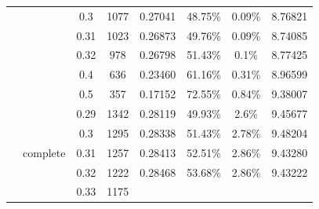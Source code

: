\begin{table}[H]
{\begin{tabular}{|cccccccc|}
\multicolumn{1}{|c|}{} &
  \multicolumn{1}{c|}{} &
  \multicolumn{1}{c|}{0.3} &
  \multicolumn{1}{c|}{1077} &
  \multicolumn{1}{c|}{0.27041} &
  \multicolumn{1}{c|}{48.75\%} &
  \multicolumn{1}{c|}{0.09\%} &
  8.76821 \\ \cline{3-8} 
\multicolumn{1}{|c|}{} &
  \multicolumn{1}{c|}{} &
  \multicolumn{1}{c|}{0.31} &
  \multicolumn{1}{c|}{1023} &
  \multicolumn{1}{c|}{0.26873} &
  \multicolumn{1}{c|}{49.76\%} &
  \multicolumn{1}{c|}{0.09\%} &
  8.74085 \\ \cline{3-8} 
\multicolumn{1}{|c|}{} &
  \multicolumn{1}{c|}{} &
  \multicolumn{1}{c|}{0.32} &
  \multicolumn{1}{c|}{978} &
  \multicolumn{1}{c|}{0.26798} &
  \multicolumn{1}{c|}{51.43\%} &
  \multicolumn{1}{c|}{0.1\%} &
  8.77425 \\ \cline{3-8} 
\multicolumn{1}{|c|}{} &
  \multicolumn{1}{c|}{} &
  \multicolumn{1}{c|}{0.4} &
  \multicolumn{1}{c|}{636} &
  \multicolumn{1}{c|}{0.23460} &
  \multicolumn{1}{c|}{61.16\%} &
  \multicolumn{1}{c|}{0.31\%} &
  8.96599 \\ \cline{3-8} 
\multicolumn{1}{|c|}{} &
  \multicolumn{1}{c|}{} &
  \multicolumn{1}{c|}{0.5} &
  \multicolumn{1}{c|}{357} &
  \multicolumn{1}{c|}{0.17152} &
  \multicolumn{1}{c|}{72.55\%} &
  \multicolumn{1}{c|}{0.84\%} &
  9.38007 \\ \cline{2-8} 
\multicolumn{1}{|c|}{} &
  \multicolumn{1}{c|}{\multirow{8}{*}{complete}} &
  \multicolumn{1}{c|}{0.29} &
  \multicolumn{1}{c|}{1342} &
  \multicolumn{1}{c|}{0.28119} &
  \multicolumn{1}{c|}{49.93\%} &
  \multicolumn{1}{c|}{2.6\%} &
  9.45677 \\ \cline{3-8} 
\multicolumn{1}{|c|}{} &
  \multicolumn{1}{c|}{} &
  \multicolumn{1}{c|}{0.3} &
  \multicolumn{1}{c|}{1295} &
  \multicolumn{1}{c|}{0.28338} &
  \multicolumn{1}{c|}{51.43\%} &
  \multicolumn{1}{c|}{2.78\%} &
  9.48204 \\ \cline{3-8} 
\multicolumn{1}{|c|}{} &
  \multicolumn{1}{c|}{} &
  \multicolumn{1}{c|}{0.31} &
  \multicolumn{1}{c|}{1257} &
  \multicolumn{1}{c|}{0.28413} &
  \multicolumn{1}{c|}{52.51\%} &
  \multicolumn{1}{c|}{2.86\%} &
  9.43280 \\ \cline{3-8} 
\multicolumn{1}{|c|}{} &
  \multicolumn{1}{c|}{} &
  \multicolumn{1}{c|}{0.32} &
  \multicolumn{1}{c|}{1222} &
  \multicolumn{1}{c|}{0.28468} &
  \multicolumn{1}{c|}{53.68\%} &
  \multicolumn{1}{c|}{2.86\%} &
  9.43222 \\ \cline{3-8} 
\multicolumn{1}{|c|}{} &
  \multicolumn{1}{c|}{} &
  \multicolumn{1}{c|}{0.33} &
  \multicolumn{1}{c|}{1175} &

\end{tabular}}
\end{table}
